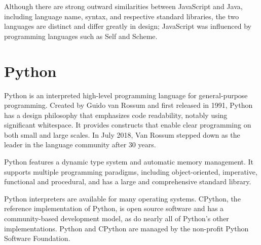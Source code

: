 Although there are strong outward similarities between JavaScript and Java, including language name, syntax, and respective standard libraries, the two languages are distinct and differ greatly in design; JavaScript was influenced by programming languages such as Self and Scheme.

\section{Python}
Python is an interpreted high-level programming language for general-purpose programming. Created by Guido van Rossum and first released in 1991, Python has a design philosophy that emphasizes code readability, notably using significant whitespace. It provides constructs that enable clear programming on both small and large scales. In July 2018, Van Rossum stepped down as the leader in the language community after 30 years.

Python features a dynamic type system and automatic memory management. It supports multiple programming paradigms, including object-oriented, imperative, functional and procedural, and has a large and comprehensive standard library.

Python interpreters are available for many operating systems. CPython, the reference implementation of Python, is open source software and has a community-based development model, as do nearly all of Python's other implementations. Python and CPython are managed by the non-profit Python Software Foundation. 


